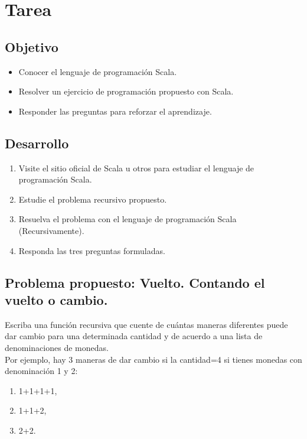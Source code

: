 \section{Tarea}

\subsection{Objetivo}

\begin{itemize}
    \item Conocer el lenguaje de programación Scala.
    \item Resolver un ejercicio de programación propuesto con Scala.
    \item Responder las preguntas para reforzar el aprendizaje.
\end{itemize}


\subsection{Desarrollo}

\begin{enumerate}[label=\alph*.]
  \item Visite el sitio oficial de Scala u otros para estudiar el lenguaje de programación Scala.
  \item Estudie el problema recursivo propuesto.
  \item Resuelva el problema con el lenguaje de programación Scala (Recursivamente).
  \item Responda las tres preguntas formuladas.
\end{enumerate}


\subsection{Problema propuesto: Vuelto. Contando el vuelto o cambio.}

Escriba una función recursiva que cuente de cuántas maneras diferentes puede dar cambio para una determinada cantidad y de acuerdo a una lista de denominaciones de monedas.\\
Por ejemplo, hay 3 maneras de dar cambio si la cantidad=4 si tienes monedas con
denominación 1 y 2:
\begin{enumerate}[label={ }]
    \item 1+1+1+1,
    \item 1+1+2,
    \item 2+2.
\end{enumerate}

